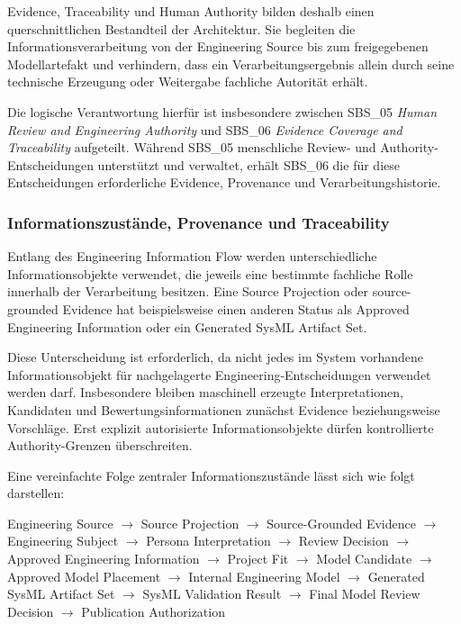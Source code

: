 Evidence, Traceability und Human Authority bilden deshalb einen
querschnittlichen Bestandteil der Architektur. Sie begleiten die
Informationsverarbeitung von der Engineering Source bis zum freigegebenen
Modellartefakt und verhindern, dass ein Verarbeitungsergebnis allein durch
seine technische Erzeugung oder Weitergabe fachliche Autorität erhält.

Die logische Verantwortung hierfür ist insbesondere zwischen
SBS\_05 \emph{Human Review and Engineering Authority} und
SBS\_06 \emph{Evidence Coverage and Traceability} aufgeteilt.
Während SBS\_05 menschliche Review- und Authority-Entscheidungen unterstützt
und verwaltet, erhält SBS\_06 die für diese Entscheidungen erforderliche
Evidence, Provenance und Verarbeitungshistorie.

\subsubsection{Informationszustände, Provenance und Traceability}
\label{sec:information_states_traceability}

Entlang des Engineering Information Flow werden unterschiedliche
Informationsobjekte verwendet, die jeweils eine bestimmte fachliche Rolle
innerhalb der Verarbeitung besitzen. Eine Source Projection oder
source-grounded Evidence hat beispielsweise einen anderen Status als
Approved Engineering Information oder ein Generated SysML Artifact Set.

Diese Unterscheidung ist erforderlich, da nicht jedes im System vorhandene
Informationsobjekt für nachgelagerte Engineering-Entscheidungen verwendet
werden darf. Insbesondere bleiben maschinell erzeugte Interpretationen,
Kandidaten und Bewertungsinformationen zunächst Evidence beziehungsweise
Vorschläge. Erst explizit autorisierte Informationsobjekte dürfen kontrollierte
Authority-Grenzen überschreiten.

Eine vereinfachte Folge zentraler Informationszustände lässt sich wie folgt
darstellen:

\begin{center}
\small
Engineering Source
$\rightarrow$ Source Projection
$\rightarrow$ Source-Grounded Evidence
$\rightarrow$ Engineering Subject
$\rightarrow$ Persona Interpretation
$\rightarrow$ Review Decision
$\rightarrow$ Approved Engineering Information
$\rightarrow$ Project Fit
$\rightarrow$ Model Candidate
$\rightarrow$ Approved Model Placement
$\rightarrow$ Internal Engineering Model
$\rightarrow$ Generated SysML Artifact Set
$\rightarrow$ SysML Validation Result
$\rightarrow$ Final Model Review Decision
$\rightarrow$ Publication Authorization
\end{center}

